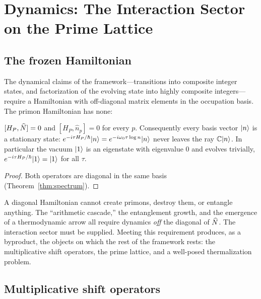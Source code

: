 
\section{Dynamics: The Interaction Sector on the Prime Lattice}\label{sec:dynamics}

\subsection{The frozen Hamiltonian}

The dynamical claims of the framework---transitions into composite integer states, and
factorization of the evolving state into highly composite integers---require a Hamiltonian
with off-diagonal matrix elements in the occupation basis. The primon Hamiltonian has none:

\begin{proposition}\label{prop:frozen}
$[H_{P},\widehat{N}]=0$ and $[H_{P},\hat n_{p}]=0$ for every $p$. Consequently every basis vector
$\lvert n\rangle$ is a stationary state: $e^{-i\tau H_{P}/\hbar}\lvert n\rangle=e^{-i\omega_{0}\tau\log
n}\lvert n\rangle$ never leaves the ray $\mathbb{C}\lvert n\rangle$. In particular the vacuum $\lvert 1\rangle$ is an
eigenstate with eigenvalue $0$ and evolves trivially, $e^{-i\tau H_{P}/\hbar}\lvert 1\rangle=\lvert 1\rangle$
for all $\tau$.
\end{proposition}

\begin{proof}
Both operators are diagonal in the same basis (Theorem~\ref{thm:spectrum}).
\end{proof}

A diagonal Hamiltonian cannot create primons, destroy them, or entangle anything. The
``arithmetic cascade,'' the entanglement growth, and the emergence of a thermodynamic arrow
all require dynamics \emph{off} the diagonal of $\widehat{N}$. The interaction sector must be
supplied. Meeting this requirement produces, as a byproduct, the objects on which the rest
of the framework rests: the multiplicative shift operators, the prime lattice, and a
well-posed thermalization problem.

\subsection{Multiplicative shift operators}


